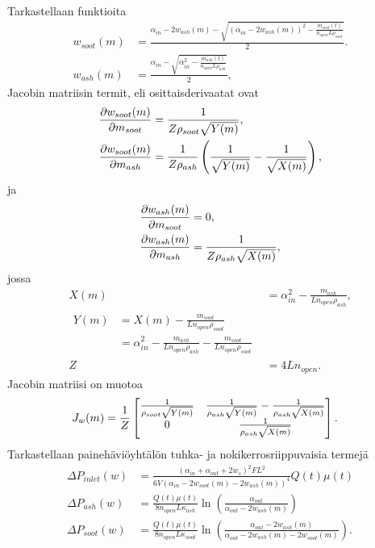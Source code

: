 Tarkastellaan funktioita 
\begin{align*}
    w_{soot}(m)
        &= \frac{\alpha_{in}-2w_{ash}(m) - \sqrt{(\alpha_{in}-2w_{ash}(m))^2 - \frac{m_{soot}(t)}{ n_{open} L \rho_{soot}}}}{2}.
    \\ 
    w_{ash}(m)
        &=\frac{\alpha_{in} - \sqrt{\alpha_{in}^2 - \frac{m_{ash}(t)}{ n_{open} L \rho_{ash}}}}{2} ,
\end{align*}
Jacobin matriisin termit, eli osittaisderivaatat ovat
\begin{align}
    \frac{\partial w_{soot}(m)}{\partial m_{soot}} &= \frac{1}{Z\rho_{soot} \sqrt{Y(m)}},
    \\
    \frac{\partial w_{soot}(m)}{\partial m_{ash}} &=
    \frac{1}{Z \rho_{ash}} \left( \frac{1}{\sqrt{Y(m)}}-\frac{1}{\sqrt{X(m)}} \right),
\end{align}
ja
\begin{align}
    \frac{\partial w_{ash}(m)}{\partial m_{soot}}&=0,
    \\
    \frac{\partial w_{ash}(m)}{\partial m_{ash}}&=\frac{1}{Z \rho_{ash} \sqrt{X(m)}},
\end{align}
jossa 
\begin{align}
    X(m) &= \alpha_{in}^2 -\frac{m_{ash}}{L n_{open} \rho_{ash}},
    \\
    \begin{split}
        Y(m) &= X(m) - \frac{m_{soot}}{L n_{open} \rho_{soot}}  
        \\&= \alpha_{in}^2 -\frac{m_{ash}}{L n_{open} \rho_{ash}}- \frac{m_{soot}}{L n_{open} \rho_{soot}}
    \end{split}
    \\
    Z &= 4 L n_{open}.
\end{align}
Jacobin matriisi on muotoa
\begin{align}
    J_{w}(m) &=
    \frac{1}{Z} 
    \begin{bmatrix} 
        \frac{1}{\rho_{soot}\sqrt{Y(m)}}
        &
        \frac{1}{\rho_{ash} \sqrt{Y(m)}}-\frac{1}{\rho_{ash} \sqrt{X(m)}} 
        \\
        0 
        &
        \frac{1}{\rho_{ash} \sqrt{X(m)}} 
     \end{bmatrix}.
\end{align}
Tarkastellaan painehäviöyhtälön tuhka- ja nokikerrosriippuvaisia termejä
\begin{align}
    \Delta P_{inlet}(w) &=   
    \frac{(\alpha_{in}+\alpha_{out}+2 w_s)^2FL^2}{6V(\alpha_{in} -2w_{soot}(m)-2w_{ash}(m))^4 }Q(t) \mu(t)
        \\
    \Delta P_{ash}(w) &=
    \frac{Q(t)\mu(t)}{8 n_{open} L \kappa_{ash}}\ln\left(\frac{\alpha_{out}}{\alpha_{out}-2w_{ash}(m)}\right)
        \\
    \Delta P_{soot}(w) &= \frac{Q(t)\mu(t)}{8 n_{open} L \kappa_{soot}}\ln\left(\frac{\alpha_{out}-2w_{ash}(m)}{\alpha_{out}-2w_{ash}(m)-2w_{soot}(m)}\right).
\end{align}

